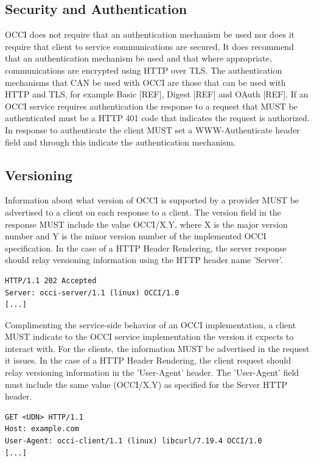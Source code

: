 \documentclass[10pt,a4paper]{article}
\begin{document}
\subsection{Security and Authentication}
OCCI does not require that an authentication mechanism be used nor does it require that client to service communications are secured. It does recommend that an authentication mechanism be used and that where appropriate, communications are encrypted using HTTP over TLS. The authentication mechanisms that CAN be used with OCCI are those that can be used with HTTP and TLS, for example Basic [REF], Digest [REF] and OAuth [REF]. If an OCCI service requires authentication the response to a request that MUST be authenticated must be a HTTP 401 code that indicates the request is authorized. In response to authenticate the client MUST set a WWW-Authenticate header field and through this indicate the authentication mechanism. 

\subsection{Versioning}
Information about what version of OCCI is supported by a provider MUST be advertised to a client on each response to a client. The version field in the response MUST include the value OCCI/X.Y, where X is the major version number and Y is the minor version number of the implemented OCCI specification. In the case of a HTTP Header Rendering, the server response should relay versioning information using the HTTP header name 'Server'.

\begin{verbatim}
HTTP/1.1 202 Accepted
Server: occi-server/1.1 (linux) OCCI/1.0
[...]
\end{verbatim}

Complimenting the service-side behavior of an OCCI implementation, a client MUST indicate to the OCCI service implementation the version it expects to interact with. For the clients, the information MUST be advertised in the request it issues. In the case of a HTTP Header Rendering, the client request should relay versioning information in the 'User-Agent' header. The 'User-Agent' field must include the same value (OCCI/X.Y) as specified for the Server HTTP header.

\begin{verbatim}
GET <UDN> HTTP/1.1
Host: example.com
User-Agent: occi-client/1.1 (linux) libcurl/7.19.4 OCCI/1.0
[...]
\end{verbatim}
\end{document}
